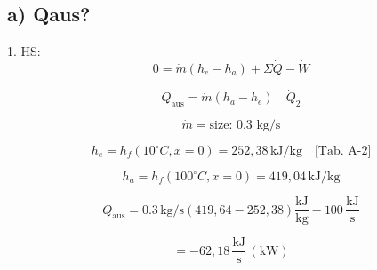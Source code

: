 \subsection*{a) Qaus?}

1. HS:
\[
0 = \dot{m}(h_e - h_a) + \Sigma \dot{Q} - \dot{W}
\]

\[
Q_{\text{aus}} = \dot{m}(h_a - h_e) \quad \dot{Q}_2
\]

\[
\dot{m} = \text{size: 0.3 kg/s}
\]

\[
h_e = h_f(10^\circ C, x=0) = 252,38 \, \text{kJ/kg} \quad \text{[Tab. A-2]}
\]

\[
h_a = h_f(100^\circ C, x=0) = 419,04 \, \text{kJ/kg}
\]

\[
Q_{\text{aus}} = 0.3 \, \text{kg/s} \left( 419,64 - 252,38 \right) \frac{\text{kJ}}{\text{kg}} - 100 \, \frac{\text{kJ}}{\text{s}}
\]

\[
= -62,18 \, \frac{\text{kJ}}{\text{s}} \, (\text{kW})
\]